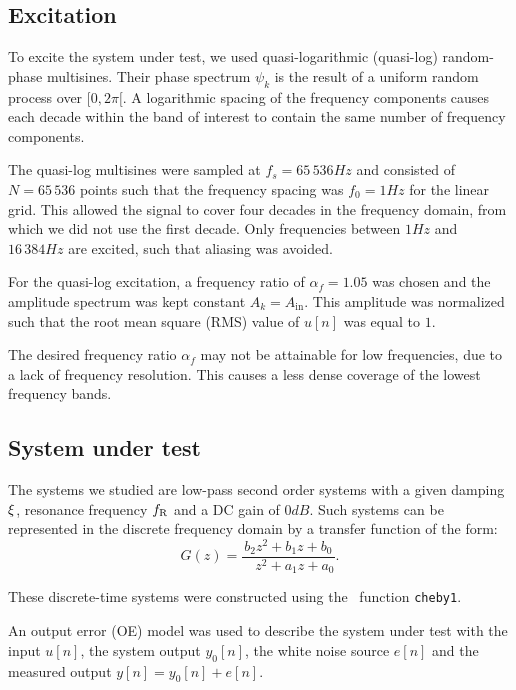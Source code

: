 \subsection{Excitation}
To excite the system under test, we used quasi-logarithmic (quasi-log) random-phase multisines. 
Their phase spectrum $\psi_{k}$ is the result of a uniform random process over $[0,2\pi[$.
A logarithmic spacing of the frequency components causes each decade within the band of interest to contain the same number of frequency components.

The quasi-log multisines were sampled at $f_s = 65\,536 \unit{Hz}$
and consisted of $N= 65\,536$ points such that the frequency spacing was $f_0 = 1\unit{Hz}$ for the linear grid.
This allowed the signal to cover four decades in the frequency domain,
from which we did not use the first decade.
Only frequencies between $1\unit{Hz}$ and $16\,384\unit{Hz}$ are excited, such that aliasing was avoided.

For the quasi-log excitation, a frequency ratio of $\alpha_f = 1.05$ was chosen
and the amplitude spectrum was kept constant $A_k = A_{\mathrm{in}}$. This
amplitude was normalized such that the root mean square (RMS) value of $u[n]$
was equal to $1$.

The desired frequency ratio $\alpha_f$ may not be attainable for low frequencies,  due to a lack of frequency resolution.
This causes a less dense coverage of the lowest frequency bands.

\subsection{System under test}
The systems we studied are low-pass second order systems with a given damping
$\xi$, resonance frequency $f_{\mathrm{R}}$ and a DC gain of $0 \unit{dB}$. Such systems
can be represented in the discrete frequency domain by a transfer
function of the form:
\begin{equation}
  G \left( z \right) = \frac{         b_2  z^{2} + b_1 z + b_0}%
                            {\phantom{a_2} z^{2} + a_1 z + a_0}
  \text{.}
  \label{eq:tf}
\end{equation}

These discrete-time systems were constructed using the \matlab\ function \texttt{cheby1}.

An output error (OE) model was used to describe the system under test with the
input $u[n]$, the system output $y_0[n]$, the white noise source $e[n]$
and the measured output $y[n] = y_0[n] + e[n]$.

